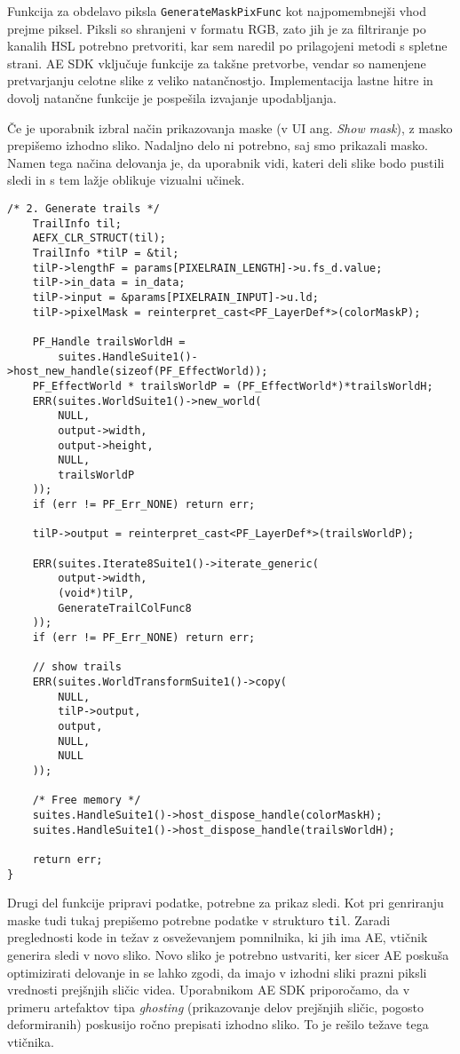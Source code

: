 \documentclass[a4paper, 12pt]{book}
\begin{document}
Funkcija za obdelavo piksla \texttt{GenerateMaskPixFunc} kot najpomembnejši vhod prejme piksel.
Piksli so shranjeni v formatu RGB, zato jih je za filtriranje po kanalih HSL potrebno pretvoriti, kar sem naredil po prilagojeni metodi s spletne strani\cite{rgbhsl}.
AE SDK vključuje funkcije za takšne pretvorbe, vendar so namenjene pretvarjanju celotne slike z veliko natančnostjo.
Implementacija lastne hitre in dovolj natančne funkcije je pospešila izvajanje upodabljanja.

Če je uporabnik izbral način prikazovanja maske (v UI ang. {\it Show mask}), z masko prepišemo izhodno sliko.
Nadaljno delo ni potrebno, saj smo prikazali masko.
Namen tega načina delovanja je, da uporabnik vidi, kateri deli slike bodo pustili sledi in s tem lažje oblikuje vizualni učinek.

\begin{verbatim}
/* 2. Generate trails */
    TrailInfo til;
    AEFX_CLR_STRUCT(til);
    TrailInfo *tilP = &til;
    tilP->lengthF = params[PIXELRAIN_LENGTH]->u.fs_d.value;
    tilP->in_data = in_data;
    tilP->input = &params[PIXELRAIN_INPUT]->u.ld;
    tilP->pixelMask = reinterpret_cast<PF_LayerDef*>(colorMaskP);

    PF_Handle trailsWorldH = 
        suites.HandleSuite1()->host_new_handle(sizeof(PF_EffectWorld));
    PF_EffectWorld * trailsWorldP = (PF_EffectWorld*)*trailsWorldH;
    ERR(suites.WorldSuite1()->new_world(
        NULL,
        output->width,
        output->height,
        NULL,
        trailsWorldP
    ));
    if (err != PF_Err_NONE) return err;

    tilP->output = reinterpret_cast<PF_LayerDef*>(trailsWorldP);

    ERR(suites.Iterate8Suite1()->iterate_generic(
        output->width,
        (void*)tilP,
        GenerateTrailColFunc8
    ));
    if (err != PF_Err_NONE) return err;
    
    // show trails
    ERR(suites.WorldTransformSuite1()->copy(
        NULL,
        tilP->output,
        output,
        NULL,
        NULL
    ));

    /* Free memory */
    suites.HandleSuite1()->host_dispose_handle(colorMaskH);
    suites.HandleSuite1()->host_dispose_handle(trailsWorldH);
    
    return err;
}
\end{verbatim}

Drugi del funkcije pripravi podatke, potrebne za prikaz sledi.
Kot pri genriranju maske tudi tukaj prepišemo potrebne podatke v strukturo \texttt{til}.
Zaradi preglednosti kode in težav z osveževanjem pomnilnika, ki jih ima AE, vtičnik generira sledi v novo sliko.
Novo sliko je potrebno ustvariti, ker sicer AE poskuša optimizirati delovanje in se lahko zgodi, da imajo v izhodni sliki prazni piksli vrednosti prejšnjih sličic videa.
Uporabnikom AE SDK priporočamo, da v primeru artefaktov tipa {\it ghosting} (prikazovanje delov prejšnjih sličic, pogosto deformiranih) poskusijo ročno prepisati izhodno sliko.
To je rešilo težave tega vtičnika.
\end{document}
